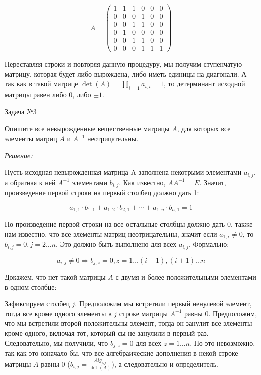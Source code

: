 \documentclass[10pt]{article}
\begin{document}
\[
A = \begin{pmatrix}
1 & 1 & 1 & 0 & 0 & 0 \\
0 & 0 & 0 & 1 & 0 & 0 \\
0 & 0 & 1 & 1 & 0 & 0 \\
0 & 1 & 0 & 0 & 0 & 0 \\
0 & 0 & 1 & 1 & 0 & 0 \\
0 & 0 & 0 & 1 & 1 & 1
\end{pmatrix}
\]

Переставляя строки и повторяя данную процедуру, мы получим ступенчатую матрицу, которая будет либо вырождена, либо иметь единицы на диагонали. А так как в такой матрице $\det(A) = \prod_{i=1} a_{i,i} = 1$, то детерминант исходной матрицы равен либо 0, либо $\pm 1$.

\hspace{2mm}

Задача №3

Опишите все невырожденные вещественные матрицы $A$, для которых все элементы матриц $A$ и $A^{-1}$ неотрицательны.

\textit{Решение:}

Пусть исходная невырожденная матрица A заполнена некотрыми элементами $a_{i,j}$, а обратная к ней $A^{-1}$ элементами $b_{i, j}$. Как известно, $AA^{-1} = E$. Значит, произведение первой строки на первый столбец должно дать 1:

\[
a_{1,1}\cdot b_{1,1} + a_{1,2}\cdot b_{2,1} + \cdots + a_{1,n}\cdot b_{n,1} = 1 
\]

Но произведение первой строки на все остальные столбцы должно дать 0, также нам известно, что все элементы матриц неотрицательны, значит если $a_{1,i} \neq 0$, то $b_{i,j} = 0, j = 2\ldots n$. Это должно быть выполнено для всех $a_{i,j}$. Формально: 

\[a_{i,j} \neq 0 \Rightarrow b_{j,z} = 0, z = 1\ldots (i-1),(i+1)\ldots n\]

 
 Докажем, что нет такой матрицы $A$ с двумя и более положительными элементами в одном столбце:
 
 \vspace{2mm}
 
 Зафиксируем столбец $j$. Предположим мы встретили первый ненулевой элемент, тогда все кроме одного элементы в $j$ строке матрицы $A^{-1}$ равны 0. Предположим, что мы встретили второй положительны элемент, тогда он занулит все элементы кроме одного, включая тот, который сы не занулили в первый раз. Следовательно, мы получили, что $b_{j,z} = 0$ для всех $z = 1\ldots n$.
 Но это невозможно, так как это означало бы, что все алгебраические дополнения в некой строке матрицы $A$ равны 0 ($b_{i,j} = \frac{Alg_{i,j}}{\det(A)}$), а следовательно и определитель. 
\end{document}
